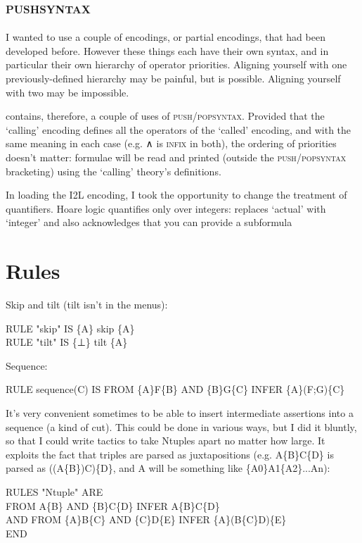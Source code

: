 \subsection{\textsc{pushsyntax}}
\label{Hoare:pushsyntax}

I wanted to use a couple of encodings, or partial encodings, that had been developed before. However these things each have their own syntax, and in particular their own hierarchy of operator priorities. Aligning yourself with one previously-defined hierarchy may be painful, but is possible. Aligning yourself with two may be impossible.

 contains, therefore, a couple of uses of \textsc{push}/\textsc{popsyntax}. Provided that the `calling' encoding defines all the operators of the `called' encoding, and with the same meaning in each case (e.g. ∧ is \textsc{infix} in both), the ordering of priorities doesn't matter: formulae will be read and printed (outside the \textsc{push}/\textsc{popsyntax} bracketing) using the `calling' theory's definitions.

In loading the I2L encoding, I took the opportunity to change the treatment of quantifiers. Hoare logic quantifies only over integers:  replaces `actual' with `integer' and also acknowledges that you can provide a subformula
\section{Rules}

Skip and tilt (tilt isn't in the menus):
\begin{japeish}
RULE "skip" IS \{A\} skip \{A\} \\
RULE "tilt" IS \{⊥\} tilt \{A\}
\end{japeish}
 
Sequence:
\begin{japeish}
RULE sequence(C) IS FROM \{A\}F\{B\} AND  \{B\}G\{C\} INFER  \{A\}(F;G)\{C\}
\end{japeish}

It's very convenient sometimes to be able to insert intermediate assertions into a sequence (a kind of cut). This could be done in various ways, but I did it bluntly, so that I could write tactics to take Ntuples apart no matter how large. It exploits the fact that triples are parsed as juxtapositions (e.g. A\{B\}C\{D\} is parsed as ((A\{B\})C)\{D\}, and A will be something like \{A0\}A1\{A2\}...An):
\begin{japeish}
RULES "Ntuple" ARE \\
\tab FROM A\{B\} AND \{B\}C\{D\} INFER A\{B\}C\{D\} \\
AND FROM \{A\}B\{C\} AND \{C\}D\{E\} INFER \{A\}(B\{C\}D)\{E\} \\
END
\end{japeish}

